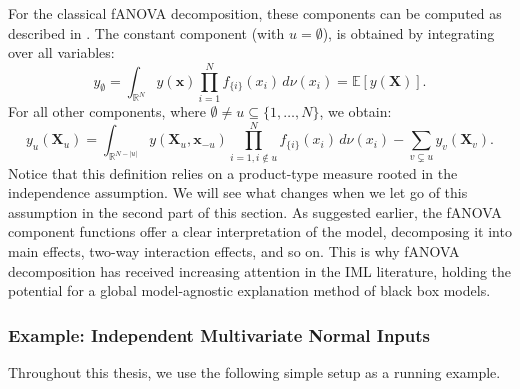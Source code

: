 For the classical fANOVA decomposition, these components can be computed as described in \cite{rahman2014}.
The constant component (with $u = \emptyset$), is obtained by integrating over all variables:
\begin{equation}
    y_{\emptyset} 
    = \int_{\mathbb{R}^N} 
        y(\boldsymbol{x}) 
        \prod_{i=1}^{N} f_{\{i\}}(x_i) 
        \, d\nu (x_i) 
    = \mathbb{E}[y(\boldsymbol{X})].
    \label{eq:intercept_classical}
\end{equation}
For all other components, where $\emptyset \neq u \subseteq \{1, \dots, N\}$, we obtain:
\begin{equation}
    y_u(\boldsymbol{X}_u) 
    = \int_{\mathbb{R}^{N- |u|}} 
        y(\boldsymbol{X}_u, \boldsymbol{x}_{-u}) 
        \prod_{i=1, i \notin u}^{N} f_{\{i\}}(x_i) 
        \, d\nu (x_i) 
      - \sum_{v \subsetneq u} y_v(\boldsymbol{X}_v).
    \label{eq:fanova_components_classical}
\end{equation}
Notice that this definition relies on a product-type measure rooted in the independence assumption. We will see what changes when we let go of this assumption in the second part of this section.
As suggested earlier, the fANOVA component functions offer a clear interpretation of the model, decomposing it into main effects, two-way interaction effects, and so on. This is why fANOVA decomposition has received increasing attention in the IML literature, holding the potential for a global model-agnostic explanation method of black box models.
\subsubsection{Example: Independent Multivariate Normal Inputs}

Throughout this thesis, we use the following simple setup as a running example.

